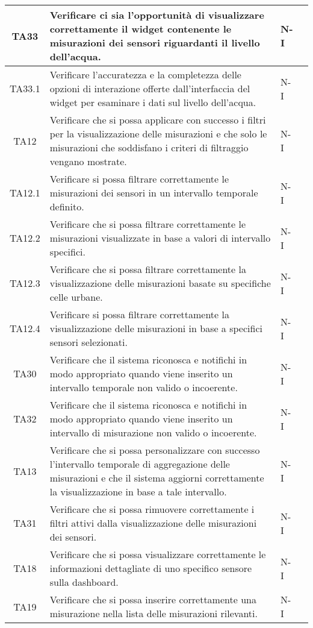 \begin{longtable}{|c|p{5cm}|p{2cm}|c|}
    \hline
    TA33 & Verificare ci sia l'opportunità di visualizzare correttamente il widget contenente le misurazioni dei sensori riguardanti il livello dell'acqua. & N-I \\
    \hline
    TA33.1 & Verificare l'accuratezza e la completezza delle opzioni di interazione offerte dall'interfaccia del widget per esaminare i dati sul livello dell'acqua. & N-I \\
    \hline
    TA12 & Verificare che si possa applicare con successo i filtri per la visualizzazione delle misurazioni e che solo le misurazioni che soddisfano i criteri di filtraggio vengano mostrate. & N-I \\
    \hline
    TA12.1 & Verificare si possa filtrare correttamente le misurazioni dei sensori in un intervallo temporale definito. & N-I \\
    \hline
    TA12.2 & Verificare che si possa filtrare correttamente le misurazioni visualizzate in base a valori di intervallo specifici. & N-I \\
    \hline
    TA12.3 & Verificare che si possa filtrare correttamente la visualizzazione delle misurazioni basate su specifiche celle urbane. & N-I \\
    \hline
    TA12.4 & Verificare si possa filtrare correttamente la visualizzazione delle misurazioni in base a specifici sensori selezionati. & N-I \\
    \hline
    TA30 & Verificare che il sistema riconosca e notifichi in modo appropriato quando viene inserito un intervallo temporale non valido o incoerente. & N-I \\
    \hline
    TA32 & Verificare che il sistema riconosca e notifichi in modo appropriato quando viene inserito un intervallo di misurazione non valido o incoerente. & N-I \\
    \hline
    TA13 & Verificare che si possa personalizzare con successo l'intervallo temporale di aggregazione delle misurazioni e che il sistema aggiorni correttamente la visualizzazione in base a tale intervallo. & N-I \\
    \hline
    TA31 & Verificare che si possa rimuovere correttamente i filtri attivi dalla visualizzazione delle misurazioni dei sensori. & N-I \\
    \hline
    TA18 & Verificare che si possa visualizzare correttamente le informazioni dettagliate di uno specifico sensore sulla dashboard. & N-I \\
    \hline
    TA19 & Verificare che si possa inserire correttamente una misurazione nella lista delle misurazioni rilevanti. & N-I \\

\end{longtable}
